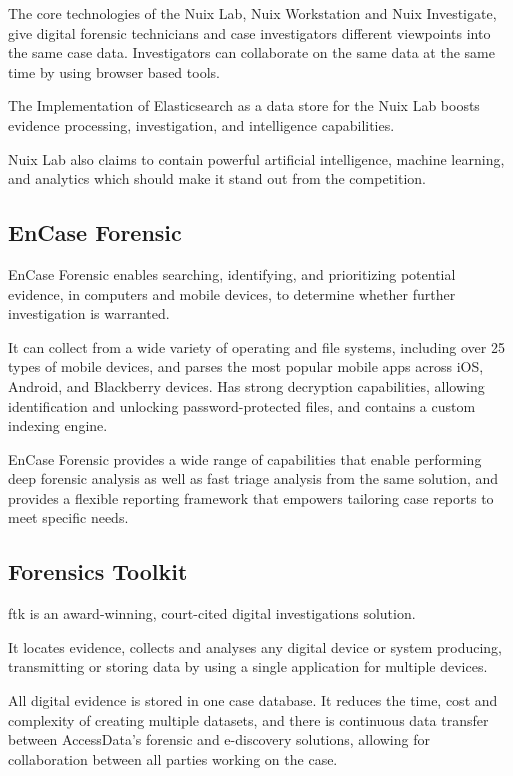 The core technologies of the Nuix Lab, Nuix Workstation and Nuix Investigate, give digital forensic technicians and case investigators 
different viewpoints into the same case data. Investigators can collaborate on 
the same data at the same time by using browser based tools.

The Implementation of Elasticsearch \cite{elasticsearch} as a data store for the Nuix Lab boosts evidence processing, investigation, and intelligence capabilities. 

Nuix Lab also claims to contain powerful artificial intelligence, machine learning, and analytics which should make it stand out from the competition. 

\subsection{EnCase Forensic}

EnCase Forensic \cite{encase} enables searching, identifying, and prioritizing potential evidence, in computers and mobile devices, to determine whether 
further investigation is warranted.

It can collect from a wide variety of operating and file systems, including over 25 types of mobile devices, and parses the most popular mobile apps across iOS, Android, and Blackberry devices.
Has strong decryption capabilities, allowing identification and unlocking password-protected files, and contains a custom indexing engine.

EnCase Forensic provides a wide range of capabilities that enable performing deep forensic analysis as well as fast triage analysis from the same solution, and provides a flexible
reporting framework that empowers tailoring case reports to meet specific needs.

\subsection{Forensics Toolkit}

\acrfull{ftk} \cite{ftk} is an award-winning, court-cited digital investigations solution. 

It locates evidence, collects and analyses any digital device or system producing, transmitting or 
storing data by using a single application for multiple devices.

All digital evidence is stored in one case database. It reduces the time, cost and complexity of creating multiple datasets, and there is continuous data transfer between AccessData's forensic 
and e-discovery solutions, allowing for collaboration between all parties working on the case. 

